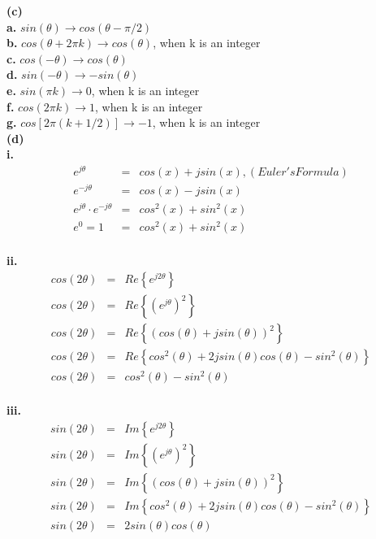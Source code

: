 \documentclass[11pt]{article}
\renewcommand\part[1]{\vspace{.10in}\textbf{(#1)}}
\newcommand\tab[1][1cm]{\hspace*{#1}}
\begin{document}
\part{c} \\
\tab \textbf{a.} $sin(\theta) \rightarrow cos(\theta - \pi / 2) $\\
\tab \textbf{b.} $cos(\theta + 2 \pi k ) \rightarrow cos(\theta) $, when k is an integer \\
\tab \textbf{c.} $cos(-\theta) \rightarrow cos(\theta) $ \\
\tab \textbf{d.} $sin(-\theta) \rightarrow -sin(\theta) $ \\
\tab \textbf{e.} $sin(\pi k) \rightarrow 0$, when k is an integer \\
\tab \textbf{f.} $cos(2 \pi k) \rightarrow 1$, when k is an integer \\
\tab \textbf{g.} $cos \left[ 2\pi \left(k + 1 / 2\right) \right]  \rightarrow -1$, when k is an integer \\

\part{d} \\
\tab \textbf{i.}
	\begin{eqnarray*}
		e^{j\theta} &=& cos(x) + j sin(x), (Euler's Formula) \\
		e^{-j\theta} &=& cos(x) - j sin(x) \\
		e^{j\theta} \cdot e^{-j\theta} &=& cos^2(x) + sin^2(x) \\
		e^0 = 1 &=& cos^2(x) + sin^2(x) \\
	\end{eqnarray*}

\tab \textbf{ii.} 
	\begin{eqnarray*}
		cos(2\theta) &=& Re\left\{ e^{j 2 \theta} \right\} \\
		cos(2\theta) &=& Re\left\{ (e^{j \theta}) ^ 2 \right\} \\
		cos(2\theta) &=& Re\left\{ (cos(\theta) + j sin(\theta)) ^2 \right\} \\
		cos(2\theta) &=& Re\left\{ cos^2(\theta) + 2 j sin(\theta) cos(\theta) - sin^2(\theta) \right\} \\
		cos(2\theta) &=& cos^2(\theta) - sin^2(\theta) \\
	\end{eqnarray*}

\tab \textbf{iii.}
	\begin{eqnarray*}
		sin(2\theta) &=& Im\left\{ e^{j 2 \theta} \right\} \\
		sin(2\theta) &=& Im\left\{ (e^{j \theta}) ^ 2 \right\} \\
		sin(2\theta) &=& Im\left\{ (cos(\theta) + j sin(\theta)) ^2 \right\} \\
		sin(2\theta) &=& Im\left\{ cos^2(\theta) + 2 j sin(\theta) cos(\theta) - sin^2(\theta) \right\} \\
		sin(2\theta) &=& 2sin(\theta)cos(\theta) \\
	\end{eqnarray*}
\end{document}
